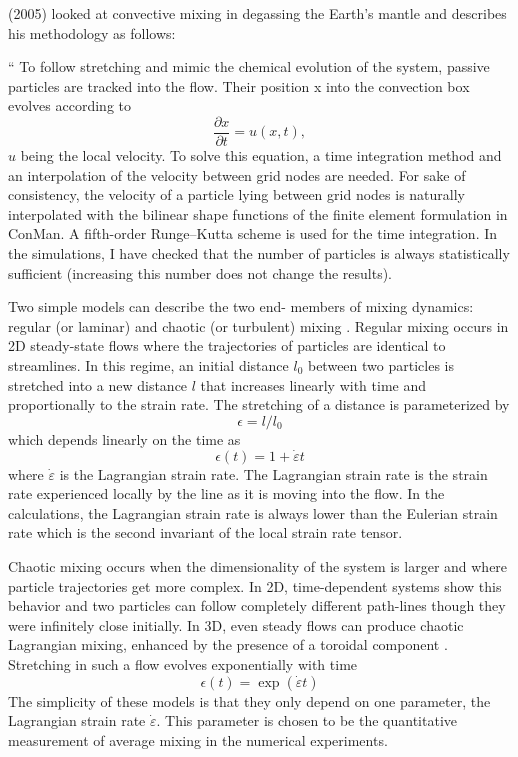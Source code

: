 \textcite{colt05} (2005) looked at 
convective mixing in degassing the Earth's mantle
and describes his methodology as follows:
\begin{displayquote}
{\color{darkgray}
``
To follow stretching and mimic the chemical
evolution of the system, passive particles are tracked
into the flow. Their position x into the convection box
evolves according to
\[
\frac{\partial x}{\partial t} = u(x,t),
\]
$u$ being the local velocity. To solve this equation, a
time integration method and an interpolation of the
velocity between grid nodes are needed. For sake of
consistency, the velocity of a particle lying between
grid nodes is naturally interpolated with the bilinear
shape functions of the finite element formulation in
ConMan. A fifth-order Runge–Kutta scheme is
used for the time integration. In the simulations, I
have checked that the number of particles is always
statistically sufficient (increasing this number does
not change the results).

Two simple models can describe the two end-
members of mixing dynamics: regular (or laminar)
and chaotic (or turbulent) mixing \cite{olyb84b}. Regular
mixing occurs in 2D steady-state flows where the
trajectories of particles are identical to streamlines. In
this regime, an initial distance $l_0$ between two
particles is stretched into a new distance $l$ that
increases linearly with time and proportionally to the
strain rate. The stretching of a distance is parameterized by
\[
\epsilon= l/l_0
\]
which depends linearly on the time as
\begin{equation}\label{eq:mixx:05}
\epsilon(t) = 1+\dot \varepsilon t
\end{equation}
where $\dot{\varepsilon}$ is the Lagrangian strain rate. 
The Lagrangian strain rate is the strain rate experienced locally
by the line as it is moving into the flow. In the
calculations, the Lagrangian strain rate is always
lower than the Eulerian strain rate which is the
second invariant of the local strain rate tensor.

Chaotic mixing occurs when the dimensionality of
the system is larger and where particle trajectories get
more complex. In 2D, time-dependent systems show
this behavior and two particles can follow completely
different path-lines though they were infinitely close
initially. In 3D, even steady flows can produce chaotic
Lagrangian mixing, enhanced by the presence of a
toroidal component \cite{feri98}. Stretching in such a flow
evolves exponentially with time
\[
\epsilon (t) = \exp (\dot \varepsilon t)
\]
The simplicity of these models is that they only
depend on one parameter, the Lagrangian strain rate $\dot\varepsilon$.
This parameter is chosen to be the quantitative
measurement of average mixing in the numerical
experiments. 


}
\end{displayquote}
